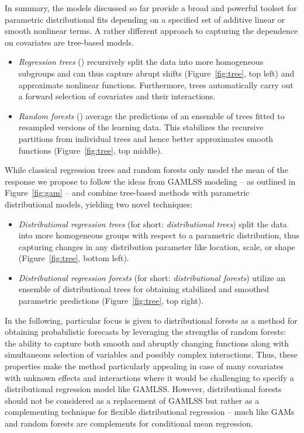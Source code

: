 \documentclass[aoas, preprint]{imsart}
\numberwithin{equation}{subsection}
\begin{document}
In summary, the models discussed so far provide a broad and powerful toolset for
parametric distributional fits depending on a specified set of additive linear or
smooth nonlinear terms. A rather different approach to capturing the dependence on
covariates are tree-based models.
\begin{itemize}
  \item \emph{Regression trees} (\citealp{Breiman+Friedman+Stone:1984}) recursively
    split the data into more homogeneous subgroups and can thus capture abrupt shifts
    (Figure~\ref{fig:tree}, top left) and approximate nonlinear functions.
    Furthermore, trees automatically carry out a forward selection of covariates and
    their interactions. 
  \item \emph{Random forests} (\citealp{Breiman:2001}) average the predictions of
    an ensemble of trees fitted to resampled versions of the learning data. This
    stabilizes the recursive partitions from individual trees and hence better
    approximates smooth functions (Figure~\ref{fig:tree}, top middle).
\end{itemize}
While classical regression trees and random forests only model the mean of the response
we propose to follow the ideas from GAMLSS modeling -- as outlined
in Figure~\ref{fig:gam} -- and combine tree-based methods with parametric distributional models,
yielding two novel techniques:
\begin{itemize}
  \item \emph{Distributional regression trees} (for short: \emph{distributional trees}) split the data into more homogeneous groups with
    respect to a parametric distribution, thus capturing changes in any distribution
    parameter like location, scale, or shape (Figure~\ref{fig:tree}, bottom left).
  \item \emph{Distributional regression forests} (for short: \emph{distributional forests}) utilize an ensemble of distributional trees
    for obtaining stabilized and smoothed parametric predictions (Figure~\ref{fig:tree},
    top right).
\end{itemize}

In the following, particular focus is given to distributional forests as a
method for obtaining probabilistic forecasts by leveraging the strengths of
random forests: the  ability to capture both smooth and abruptly changing
functions along with simultaneous selection of variables and possibly complex
interactions. Thus, these properties make the method particularly appealing in
case of many covariates with unknown effects and  interactions where it would be
challenging to specify a distributional regression model  like GAMLSS.
%
However, distributional forests should not be considered as a replacement
of GAMLSS but rather as a complementing technique for flexible distributional
regression -- much like GAMs and random forests are complements for conditional
mean regression.
\end{document}

